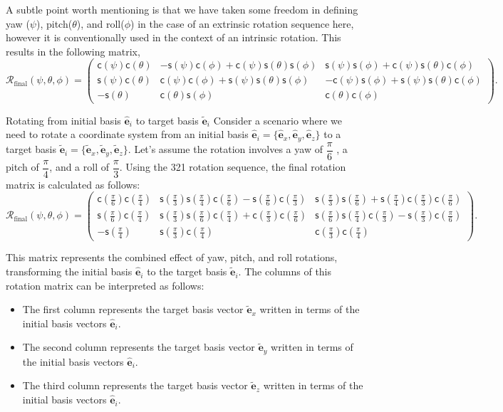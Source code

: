 \documentclass{article}
\def\eh{\hat{\mathbf{e}}}
\def\et{\tilde{\mathbf{e}}}
\def\R{\mathcal{R}}
\def\c{\textsf{c}}
\def\s{\textsf{s}}
\begin{document}
\noindent A subtle point worth mentioning is that we have taken some freedom in defining yaw (\( \psi \)), pitch(\( \theta \)), and roll(\( \phi \)) in the case of an extrinsic rotation sequence here, however it is conventionally used in the context of an intrinsic rotation. This results in the following matrix,
\[
  \R_{\text{final}} (\psi, \theta, \phi) = 
\begin{pmatrix}
\c(\psi)\c(\theta) & -\s(\psi)\c(\phi) + \c(\psi)\s(\theta)\s(\phi) & \s(\psi)\s(\phi) + \c(\psi)\s(\theta)\c(\phi) \\
\s(\psi)\c(\theta) & \c(\psi)\c(\phi) + \s(\psi)\s(\theta)\s(\phi) & -\c(\psi)\s(\phi) + \s(\psi)\s(\theta)\c(\phi) \\
-\s(\theta) & \c(\theta)\s(\phi) & \c(\theta)\c(\phi)
\end{pmatrix}.
\]

\begin{egsBox}[label={egs:rot3Dex1}, float, floatplacement=t]{Rotating from initial basis $\eh_i$ to target basis $\et_i$}
  \footnotesize
  Consider a scenario where we need to rotate a coordinate system from an initial basis $\eh_i = \{\eh_x, \eh_y, \eh_z\}$ to a target basis $\et_i = \{\et_x, \et_y, \et_z\}$. Let's assume the rotation involves a yaw of $\dfrac{\pi}{6}$ , a pitch of $\dfrac{\pi}{4}$, and a roll of $\dfrac{\pi}{3}$. Using the 321 rotation sequence, the final rotation matrix is calculated as follows:
 \[
  \R_{\text{final}} (\psi, \theta, \phi) = \begin{pmatrix}
\c(\frac{\pi}{6}) \c(\frac{\pi}{4}) & \s(\frac{\pi}{3}) \s(\frac{\pi}{4}) \c(\frac{\pi}{6}) - \s(\frac{\pi}{6}) \c(\frac{\pi}{3}) & \s(\frac{\pi}{3}) \s(\frac{\pi}{6}) + \s(\frac{\pi}{4}) \c(\frac{\pi}{3}) \c(\frac{\pi}{6}) \\
\s(\frac{\pi}{6}) \c(\frac{\pi}{4}) & \s(\frac{\pi}{3}) \s(\frac{\pi}{6}) \c(\frac{\pi}{4}) + \c(\frac{\pi}{3}) \c(\frac{\pi}{6}) & \s(\frac{\pi}{6}) \s(\frac{\pi}{4}) \c(\frac{\pi}{3}) - \s(\frac{\pi}{3}) \c(\frac{\pi}{6}) \\
-\s(\frac{\pi}{4}) & \s(\frac{\pi}{3}) \c(\frac{\pi}{4}) & \c(\frac{\pi}{3}) \c(\frac{\pi}{4})
\end{pmatrix}.
\]

 This matrix represents the combined effect of yaw, pitch, and roll rotations, transforming the initial basis $\eh_i$ to the target basis $\et_i$. The columns of this rotation matrix can be interpreted as follows:
  \begin{itemize}
    \item The first column represents the target basis vector $\et_x$ written in terms of the initial basis vectors $\eh_i$.
    \item The second column represents the target basis vector $\et_y$ written in terms of the initial basis vectors $\eh_i$.
    \item The third column represents the target basis vector $\et_z$ written in terms of the initial basis vectors $\eh_i$.
  \end{itemize}
\end{egsBox}
\end{document}
